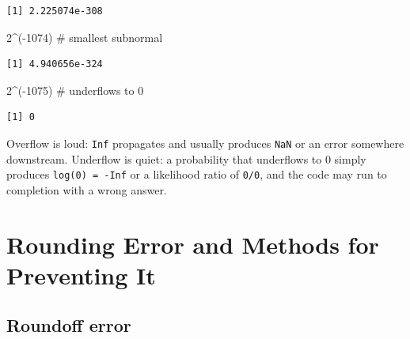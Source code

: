 \documentclass[
  letterpaper,
  DIV=11,
  numbers=noendperiod]{scrreprt}
\newenvironment{Shaded}{\begin{snugshade}}{\end{snugshade}}
\newcommand{\CommentTok}[1]{\textcolor[rgb]{0.37,0.37,0.37}{#1}}
\newcommand{\DecValTok}[1]{\textcolor[rgb]{0.68,0.00,0.00}{#1}}
\newcommand{\DocumentationTok}[1]{\textcolor[rgb]{0.37,0.37,0.37}{\textit{#1}}}
\newcommand{\NormalTok}[1]{\textcolor[rgb]{0.00,0.23,0.31}{#1}}
\newcommand{\SpecialCharTok}[1]{\textcolor[rgb]{0.37,0.37,0.37}{#1}}
\begin{document}
\begin{Shaded}
\end{Shaded}

\begin{verbatim}
[1] 2.225074e-308
\end{verbatim}

\begin{Shaded}
\begin{Highlighting}[]
\DecValTok{2}\SpecialCharTok{\^{}}\NormalTok{(}\SpecialCharTok{{-}}\DecValTok{1074}\NormalTok{)              }\CommentTok{\# smallest subnormal}
\end{Highlighting}
\end{Shaded}

\begin{verbatim}
[1] 4.940656e-324
\end{verbatim}

\begin{Shaded}
\begin{Highlighting}[]
\DecValTok{2}\SpecialCharTok{\^{}}\NormalTok{(}\SpecialCharTok{{-}}\DecValTok{1075}\NormalTok{)              }\CommentTok{\# underflows to 0}
\end{Highlighting}
\end{Shaded}

\begin{verbatim}
[1] 0
\end{verbatim}

Overflow is loud: \texttt{Inf} propagates and usually produces
\texttt{NaN} or an error somewhere downstream. Underflow is quiet: a
probability that underflows to \(0\) simply produces
\texttt{log(0)\ =\ -Inf} or a likelihood ratio of \texttt{0/0}, and the
code may run to completion with a wrong answer.

\section{Rounding Error and Methods for Preventing
It}\label{rounding-error-and-methods-for-preventing-it}

\subsection{Roundoff error}\label{roundoff-error}
\end{document}
